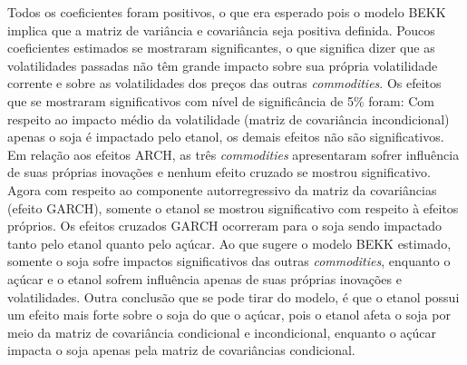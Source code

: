 Todos os coeficientes foram positivos, o que era esperado pois o modelo
BEKK implica que a matriz de variância e covariância seja positiva
definida. Poucos coeficientes estimados se mostraram significantes, o
que significa dizer que as volatilidades passadas não têm grande impacto
sobre sua própria volatilidade corrente e sobre as volatilidades dos
preços das outras \emph{commodities}. Os efeitos que se mostraram
significativos com nível de significância de 5\% foram: Com respeito ao
impacto médio da volatilidade (matriz de covariância incondicional)
apenas o soja é impactado pelo etanol, os demais efeitos não são
significativos. Em relação aos efeitos ARCH, as três \emph{commodities}
apresentaram sofrer influência de suas próprias inovações e nenhum
efeito cruzado se mostrou significativo. Agora com respeito ao
componente autorregressivo da matriz da covariâncias (efeito GARCH),
somente o etanol se mostrou significativo com respeito à efeitos
próprios. Os efeitos cruzados GARCH ocorreram para o soja sendo
impactado tanto pelo etanol quanto pelo açúcar. Ao que sugere o modelo
BEKK estimado, somente o soja sofre impactos significativos das outras
\emph{commodities}, enquanto o açúcar e o etanol sofrem influência
apenas de suas próprias inovações e volatilidades. Outra conclusão que
se pode tirar do modelo, é que o etanol possui um efeito mais forte
sobre o soja do que o açúcar, pois o etanol afeta o soja por meio da
matriz de covariância condicional e incondicional, enquanto o açúcar
impacta o soja apenas pela matriz de covariâncias condicional.


